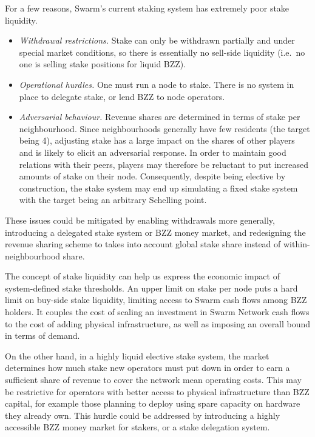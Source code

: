 For a few reasons, Swarm's current staking system has extremely poor stake liquidity.
%
\begin{itemize}

  \item \emph{Withdrawal restrictions.} Stake can only be withdrawn partially and under special market conditions, so there is essentially no sell-side liquidity (i.e.~no one is selling stake positions for liquid BZZ).
  \item \emph{Operational hurdles.} One must run a node to stake. There is no system in place to delegate stake, or lend BZZ to node operators.
  \item \emph{Adversarial behaviour.}
    Revenue shares are determined in terms of stake per neighbourhood. 
    Since neighbourhoods generally have few residents (the target being 4), adjusting stake has a large impact on the shares of other players and is likely to elicit an adversarial response. 
    In order to maintain good relations with their peers, players may therefore be reluctant to put increased amounts of stake on their node. 
    Consequently, despite being elective by construction, the stake system may end up simulating a fixed stake system with the target being an arbitrary Schelling point.
\end{itemize}
%
These issues could be mitigated by enabling withdrawals more generally, introducing a delegated stake system or BZZ money market, and redesigning the revenue sharing scheme to takes into account global stake share instead of within-neighbourhood share.

The concept of stake liquidity can help us express the economic impact of system-defined stake thresholds.
%
An upper limit on stake per node puts a hard limit on buy-side stake liquidity, limiting access to Swarm cash flows among BZZ holders. 
%
It couples the cost of scaling an investment in Swarm Network cash flows to the cost of adding physical infrastructure, as well as imposing an overall bound in terms of demand.

On the other hand, in a highly liquid elective stake system, the market determines how much stake new operators must put down in order to earn a sufficient share of revenue to cover the network mean operating costs. 
%
This may be restrictive for operators with better access to physical infrastructure than BZZ capital, for example those planning to deploy using spare capacity on hardware they already own.
%
This hurdle could be addressed by introducing a highly accessible BZZ money market for stakers, or a stake delegation system.